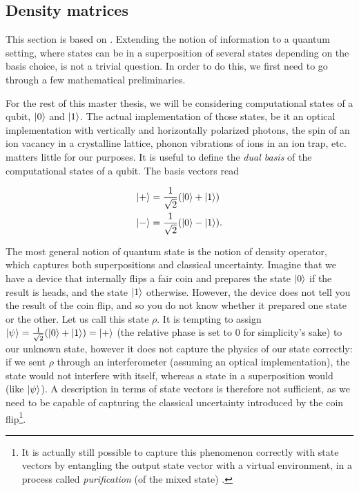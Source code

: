 
\subsection{Density matrices} \label{sec:density_matrices}

This section is based on \cite[pp. 98-108]{nielsen_quantum_2010}. Extending the notion of information to a quantum setting, where states can be in a superposition of several states depending on the basis choice, is not a trivial question. In order to do this, we first need to go through a few mathematical preliminaries. 

For the rest of this master thesis, we will be considering computational states of a qubit, $\ket{0}$ and $\ket{1}$. The actual implementation of those states, be it an optical implementation with vertically and horizontally polarized photons, the spin of an ion vacancy in a crystalline lattice, phonon vibrations of ions in an ion trap, etc. matters little for our purposes. It is useful to define the \textit{dual basis} of the computational states of a qubit. The basis vectors read

\begin{align}
    \ket{+} &= \frac{1}{\sqrt{2}} (\ket{0} + \ket{1})\\
    \ket{-} &= \frac{1}{\sqrt{2}} (\ket{0} - \ket{1}).
\end{align}

The most general notion of quantum state is the notion of density operator, which captures both superpositions and classical uncertainty. Imagine that we have a device that internally flips a fair coin and prepares the state $\ket{0}$ if the result is heads, and the state $\ket{1}$ otherwise. However, the device does not tell you the result of the coin flip, and so you do not know whether it prepared one state or the other. Let us call this state $\rho$. It is tempting to assign $\ket{\psi} = \frac{1}{\sqrt{2}}(\ket{0} + \ket{1}) = \ket{+}$ (the relative phase is set to 0 for simplicity's sake) to our unknown state, however it does not capture the physics of our state correctly: if we sent $\rho$ through an interferometer (assuming an optical implementation), the state would not interfere with itself, whereas a state in a superposition would (like $\ket{\psi}$). A description in terms of state vectors is therefore not sufficient, as we need to be capable of capturing the classical uncertainty introduced by the coin flip\footnote{It is actually still possible to capture this phenomenon correctly with state vectors by entangling the output state vector with a virtual environment, in a process called \textit{purification} (of the mixed state) \cite[p. 110]{nielsen_quantum_2010}.}.

